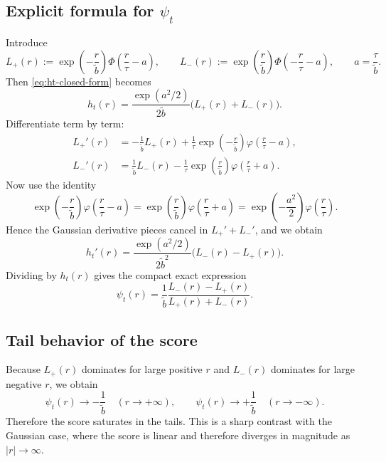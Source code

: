 \documentclass[11pt]{article}
\newcommand{\1}{\mathbf{1}}
\newcommand{\ph}{\varphi}
\newcommand{\Ph}{\Phi}
\theoremstyle{definition}
\begin{document}
\subsection{Explicit formula for \(\psi_t\)}

Introduce
\begin{equation}
L_+(r):=\exp\!\left(-\frac{r}{\tilde b}\right)\Ph\!\left(\frac{r}{\tau}-a\right),
\qquad
L_-(r):=\exp\!\left(\frac{r}{\tilde b}\right)\Ph\!\left(-\frac{r}{\tau}-a\right),
\qquad a=\frac{\tau}{\tilde b}.
\end{equation}
Then \eqref{eq:ht-closed-form} becomes
\begin{equation}
h_t(r)=\frac{\exp(a^2/2)}{2\tilde b}\big(L_+(r)+L_-(r)\big).
\end{equation}
Differentiate term by term:
\begin{align}
L_+'(r)
&= -\frac{1}{\tilde b}L_+(r)+\frac{1}{\tau}\exp\!\left(-\frac{r}{\tilde b}\right)\ph\!\left(\frac{r}{\tau}-a\right),\\[0.5em]
L_-'(r)
&= \frac{1}{\tilde b}L_-(r)-\frac{1}{\tau}\exp\!\left(\frac{r}{\tilde b}\right)\ph\!\left(\frac{r}{\tau}+a\right).
\end{align}
Now use the identity
\begin{equation}
\exp\!\left(-\frac{r}{\tilde b}\right)\ph\!\left(\frac{r}{\tau}-a\right)
=
\exp\!\left(\frac{r}{\tilde b}\right)\ph\!\left(\frac{r}{\tau}+a\right)
=
\exp\!\left(-\frac{a^2}{2}\right)\ph\!\left(\frac{r}{\tau}\right).
\end{equation}
Hence the Gaussian derivative pieces cancel in \(L_+'+L_-'\), and we obtain
\begin{equation}
h_t'(r)=\frac{\exp(a^2/2)}{2\tilde b^2}\big(L_-(r)-L_+(r)\big).
\end{equation}
Dividing by \(h_t(r)\) gives the compact exact expression
\begin{equation}
\label{eq:psi-explicit}
\boxed{
\psi_t(r)=\frac{1}{\tilde b}\frac{L_-(r)-L_+(r)}{L_+(r)+L_-(r)}.
}
\end{equation}

\subsection{Tail behavior of the score}

Because \(L_+(r)\) dominates for large positive \(r\) and \(L_-(r)\) dominates for large negative \(r\), we obtain
\begin{equation}
\psi_t(r)\to -\frac{1}{\tilde b} \quad (r\to +\infty),
\qquad
\psi_t(r)\to +\frac{1}{\tilde b} \quad (r\to -\infty).
\end{equation}
Therefore the score saturates in the tails. This is a sharp contrast with the Gaussian case, where the score is linear and therefore diverges in magnitude as \(|r|\to \infty\).
\end{document}
